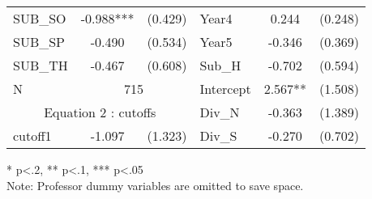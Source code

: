 \begin{table}[htb]
\begin{threeparttable}
\begin{tabular}{l c c|l c c}
    SUB\_SO                                      & -0.988***                 & (0.429)              & Year4               & 0.244                  & (0.248)              \\
    SUB\_SP                                      & -0.490                    & (0.534)              & Year5               & -0.346                 & (0.369)              \\
    SUB\_TH                                      & -0.467                    & (0.608)              & Sub\_H              & -0.702                 & (0.594)              \\
    \cline{1-3}
      N                                          & \multicolumn{2}{|c|}{715} & Intercept            & 2.567**             & (1.508)                                       \\
    \cline{1-3}
    \multicolumn{3}{c|}{Equation 2 : cutoffs}                                                     & Div\_N & -0.363                 & (1.389)                             \\
    \cline{1-3}
    cutoff1                                      & -1.097                    & (1.323)              & Div\_S              & -0.270                 & (0.702)              \\
    \hline 
    \hline
  \end{tabular}
  \begin{tablenotes}
  \item{* p<.2, ** p<.1, *** p<.05 \\ Note: Professor dummy variables are omitted to save space.}
  \end{tablenotes}
  \centering\thepage
  \end{threeparttable}
\end{table}

\clearpage{}

\newpage{}

